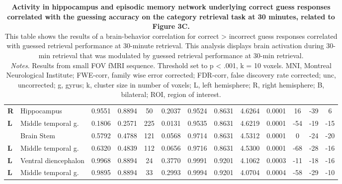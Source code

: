 \begin{landscape}
\begin{table}[!ht]
\begin{tabular}{ll|cccc|cccc|ccc}
        \textbf{R} & Hippocampus & 0.9551 & 0.8894 & 50 & 0.2037 & 0.9524 & 0.8631 & 4.6264 & 0.0001 & 16 & -39 & 6 \\ 
        \textbf{L} & Middle temporal g. & 0.1806 & 0.2571 & 225 & 0.0131 & 0.9535 & 0.8631 & 4.6219 & 0.0001 & -54 & -19 & -15 \\ 
        \textbf{} & Brain Stem & 0.5792 & 0.4788 & 121 & 0.0568 & 0.9714 & 0.8631 & 4.5312 & 0.0001 & 0 & -24 & -20 \\ 
        \textbf{L} & Middle temporal g. & 0.6320 & 0.4839 & 112 & 0.0656 & 0.9716 & 0.8631 & 4.5300 & 0.0001 & -68 & -28 & -16 \\ 
        \textbf{L} & Ventral diencephalon & 0.9968 & 0.8894 & 24 & 0.3770 & 0.9991 & 0.9201 & 4.1062 & 0.0003 & -11 & -18 & -16 \\ 
        \textbf{L} & Middle temporal g. & 0.9895 & 0.8894 & 33 & 0.2993 & 0.9994 & 0.9201 & 4.0704 & 0.0004 & -58 & -29 & -10 \\ \hline
    
    \end{tabular}
    \vspace{1.0 em}
    \caption{\textbf{Activity in hippocampus and episodic memory network underlying correct guess responses correlated with the guessing accuracy on the category retrieval task at 30 minutes, related to Figure 3C.} \\ 
    This table shows the results of a brain-behavior correlation for correct > incorrect guess responses correlated with guessed retrieval performance at 30-minute retrieval. This analysis displays brain activation during 30-min retrieval that was modulated by guessed retrieval performance at 30-min retrieval. \\ 
    \vspace{1.0 em} \textit{Notes}. Results from small FOV fMRI sequence. Threshold set to p < .001, k = 10 voxels. MNI, Montreal Neurological Institute; FWE-corr, family wise error corrected; FDR-corr, false discovery rate corrected; unc, uncorrected; g, gyrus; k, cluster size in number of voxels; L, left hemisphere; R, right hemisphere; B, bilateral; ROI, region of interest.}
    \label{tab:unconsciousCORR_Day1}
\end{table}
\end{landscape}

